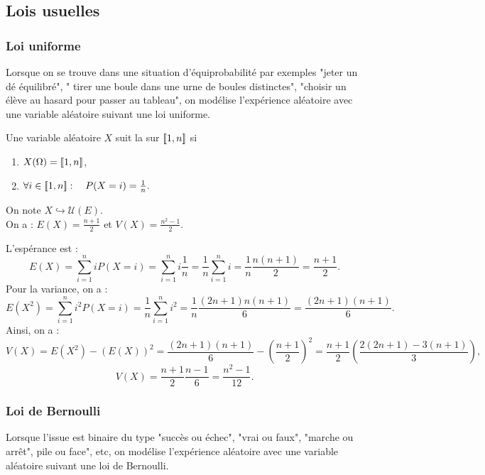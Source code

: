 \documentclass{book}
\begin{document}
\subsection{Lois usuelles}

\subsubsection{Loi uniforme}

Lorsque on se trouve dans une situation d'équiprobabilité par exemples "jeter un dé équilibré", " tirer une boule dans une urne de boules distinctes", "choisir un élève au hasard pour passer au tableau", on modélise l'expérience aléatoire avec une variable aléatoire suivant une loi uniforme.
\begin{DefinitionProposition}
Une variable aléatoire $X$ suit la  sur $\mathopen\lbrack\!\lbrack1,n \mathclose\rbrack\!\rbrack$
si 
\begin{enumerate}
\item $X(\Omega)=\mathopen\lbrack\!\lbrack1,n \mathclose\rbrack\!\rbrack$,
\item $\forall i\in \mathopen\lbrack\!\lbrack1,n \mathclose\rbrack\!\rbrack:\quad  P(X=i) = \frac{1}{n}.$ 
\end{enumerate} 
On note $X \hookrightarrow \mathcal{U}(E)$.\\
On a : $E(X)=\frac{n+1}{2}$ et $V(X)=\frac{n^2-1}{2}$.
\end{DefinitionProposition}
\begin{Demonstration}
L'espérance est :
$$E(X)=\sum_{i=1}^n iP(X=i)=\sum_{i=1}^n i \frac{1}{n}=\frac{1}{n} \sum_{i=1}^n i =\frac{1}{n} \frac{n(n+1)}{2}=\frac{n+1}{2}.$$
Pour la variance, on a :
$$E(X^2)=\sum_{i=1}^n i^2P(X=i)=\frac{1}{n} \sum_{i=1}^n i^2 =\frac{1}{n} \frac{(2n+1)n(n+1)}{6}=\frac{(2n+1)(n+1)}{6}.$$
Ainsi, on a :
$$V(X)=E(X^2) - (E(X))^2=\frac{(2n+1)(n+1)}{6}- \left(\frac{n+1}{2}\right)^2=\frac{n+1}{2}\left(\frac{2(2n+1)-3(n+1)}{3}\right),$$
$$V(X)=\frac{n+1}{2}\frac{n-1}{6}=\frac{n^2-1}{12}.$$
\end{Demonstration}
\subsubsection{Loi de Bernoulli}
Lorsque l'issue est binaire du
type "succès ou échec", "vrai ou faux", "marche ou arrêt", pile
ou face", etc, on modélise l'expérience aléatoire avec une variable aléatoire suivant une loi de Bernoulli.
\end{document}
